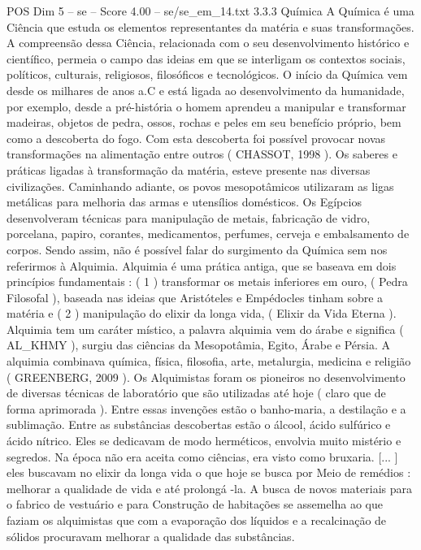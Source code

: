 \begin{textsample}{POS Dim 5 – se – Score 4.00 – se/se\_em\_14.txt}  \label{ex:f5_pos_140}
3.3.3 Química A Química é uma Ciência que estuda os elementos representantes da matéria e suas transformações.
A compreensão dessa Ciência, relacionada com o seu desenvolvimento histórico e científico, permeia o campo das ideias em que se interligam os contextos sociais, políticos, culturais, religiosos, filosóficos e tecnológicos.
O início da Química vem desde os milhares de anos a.C e está ligada ao desenvolvimento da humanidade, por exemplo, desde a pré-história o homem aprendeu a manipular e transformar madeiras, objetos de pedra, ossos, rochas e peles em seu benefício próprio, bem como a descoberta do fogo.
Com esta descoberta foi possível provocar novas transformações na alimentação entre outros ( CHASSOT, 1998 ).
Os saberes e práticas ligadas à transformação da matéria, esteve presente nas diversas civilizações.
Caminhando adiante, os povos mesopotâmicos utilizaram as ligas metálicas para melhoria das armas e utensílios domésticos.
Os Egípcios desenvolveram técnicas para manipulação de metais, fabricação de vidro, porcelana, papiro, corantes, medicamentos, perfumes, cerveja e embalsamento de corpos.
Sendo assim, não é possível falar do surgimento da Química sem nos referirmos à Alquimia.
Alquimia é uma prática antiga, que se baseava em dois princípios fundamentais : ( 1 ) transformar os metais inferiores em ouro, ( Pedra Filosofal ), baseada nas ideias que Aristóteles e Empédocles tinham sobre a matéria e ( 2 ) manipulação do elixir da longa vida, ( Elixir da Vida Eterna ).
Alquimia tem um caráter místico, a palavra alquimia vem do árabe e significa ( AL\_KHMY ), surgiu das ciências da Mesopotâmia, Egito, Árabe e Pérsia.
A alquimia combinava química, física, filosofia, arte, metalurgia, medicina e religião ( GREENBERG, 2009 ).
Os Alquimistas foram os pioneiros no desenvolvimento de diversas técnicas de laboratório que são utilizadas até hoje ( claro que de forma aprimorada ).
Entre essas invenções estão o banho-maria, a destilação e a sublimação.
Entre as substâncias descobertas estão o álcool, ácido sulfúrico e ácido nítrico.
Eles se dedicavam de modo herméticos, envolvia muito mistério e segredos.
Na época não era aceita como ciências, era visto como bruxaria. [... ] eles buscavam no elixir da longa vida o que hoje se busca por Meio de remédios : melhorar a qualidade de vida e até prolongá -la.
A busca de novos materiais para o fabrico de vestuário e para Construção de habitações se assemelha ao que faziam os alquimistas que com a evaporação dos líquidos e a recalcinação de sólidos procuravam melhorar a qualidade das substâncias.

\end{textsample}
